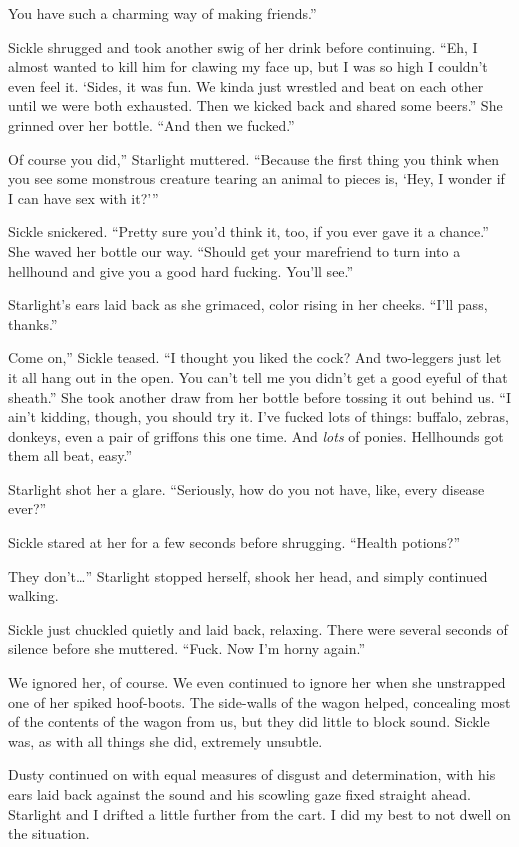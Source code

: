 \leavevmode{}You have such a charming way of making friends.”

Sickle shrugged and took another swig of her drink before continuing. “Eh, I almost wanted to kill him for clawing my face up, but I was so high I couldn’t even feel it. ‘Sides, it was fun. We kinda just wrestled and beat on each other until we were both exhausted. Then we kicked back and shared some beers.” She grinned over her bottle. “And then we fucked.”

\leavevmode{}Of course you did,” Starlight muttered. “Because the first thing you think when you see some monstrous creature tearing an animal to pieces is, ‘Hey, I wonder if I can have sex with it?’”

Sickle snickered. “Pretty sure you’d think it, too, if you ever gave it a chance.” She waved her bottle our way. “Should get your marefriend to turn into a hellhound and give you a good hard fucking. You’ll see.”

Starlight’s ears laid back as she grimaced, color rising in her cheeks. “I’ll pass, thanks.”

\leavevmode{}Come on,” Sickle teased. “I thought you liked the cock? And two-leggers just let it all hang out in the open. You can’t tell me you didn’t get a good eyeful of that sheath.” She took another draw from her bottle before tossing it out behind us. “I ain’t kidding, though, you should try it. I’ve fucked lots of things: buffalo, zebras, donkeys, even a pair of griffons this one time. And \textit{lots} of ponies. Hellhounds got them all beat, easy.”

Starlight shot her a glare. “Seriously, how do you not have, like, every disease ever?”

Sickle stared at her for a few seconds before shrugging. “Health potions?”

\leavevmode{}They don’t…” Starlight stopped herself, shook her head, and simply continued walking.

Sickle just chuckled quietly and laid back, relaxing. There were several seconds of silence before she muttered. “Fuck. Now I’m horny again.”

We ignored her, of course. We even continued to ignore her when she unstrapped one of her spiked hoof-boots. The side-walls of the wagon helped, concealing most of the contents of the wagon from us, but they did little to block sound. Sickle was, as with all things she did, extremely unsubtle.

Dusty continued on with equal measures of disgust and determination, with his ears laid back against the sound and his scowling gaze fixed straight ahead. Starlight and I drifted a little further from the cart. I did my best to not dwell on the situation.

